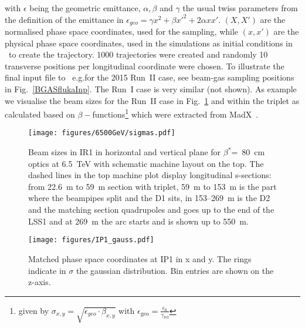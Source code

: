 with $\epsilon$ being the geometric emittance, $\alpha, \beta$ and $\gamma$ the usual twiss parameters from the definition of the emittance in $\epsilon_{geo} = \gamma x^2 + \beta x'^2 + 2 \alpha x x'$. $(X,X')$ are the normalised phase space coordinates, used for the sampling, while $(x,x')$ are the physical phase space coordinates, used in the simulations as initial conditions in \fluka~to create the trajectory. 1000 trajectories were created and randomly 10 transverse positions per longitudinal coordinate were chosen. To illustrate the final input file to \fluka~e.g.for the 2015 Run~II case, see beam-gas sampling positions in Fig.~\ref{BGASflukaInp}. The Run~I case is very similar (not shown). As example we visualise the beam sizes for the Run~II case in Fig.~\ref{twissfileBS} and within the triplet as calculated based on $\beta-$functions\footnote{given by $\sigma_{x,y} = \sqrt{\epsilon_{geo} \cdot \beta_{x,y}}$ with $\epsilon_{\textrm{geo}} = \frac{ \epsilon_{\textrm{n}}}{\gamma_{\textrm{rel}}}$} which were extracted from MadX~\cite{madx}.


\begin{figure}%
\begin{center}
  \texttt{[image: figures/6500GeV/sigmas.pdf]}
\end{center}
\vspace{-0.6cm}
 \caption{Beam sizes in IR1 in horizontal and vertical plane for $\beta^*$=~80~cm optics at 6.5~TeV with schematic machine layout on the top. The dashed lines in the top machine plot display longitudinal s-sections: from 22.6~m to 59~m section with triplet, 59~m to 153~m is the part where the beampipes split and the D1 sits, in 153--269~m is the D2 and the matching section quadrupoles and goes up to the end of the LSS1 and at 269~m the arc starts and is shown up to 550~m.
  \label{twissfileBS}}
\end{figure}
 

\begin{figure}%
\begin{center}
\texttt{[image: figures/IP1\_gauss.pdf]}
\end{center}
\vspace{-0.6cm}
 \caption{Matched phase space coordinates at IP1 in x and y. The rings indicate in $\sigma$ the gaussian distribution. Bin entries are shown on the z-axis.
  \label{ip1_gauss}}
\end{figure}


